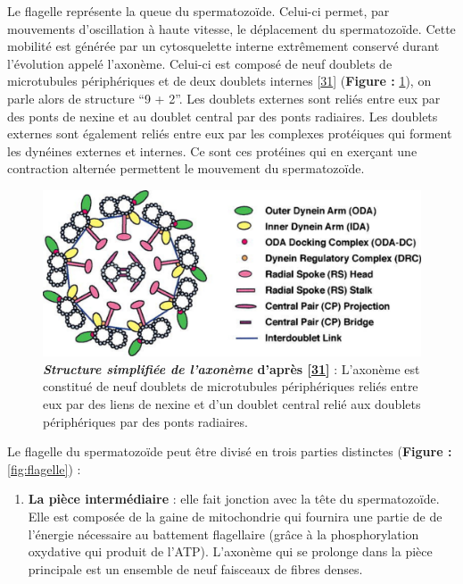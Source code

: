 \documentclass[12pt,a4paper,twoside]{ugathesis}
\providecommand{\tightlist}{%
  \setlength{\itemsep}{0pt}\setlength{\parskip}{0pt}}
\theoremstyle{definition}
\theoremstyle{definition}
\theoremstyle{definition}
\theoremstyle{remark}
\begin{document}
Le flagelle représente la queue du spermatozoïde. Celui-ci permet, par
mouvements d'oscillation à haute vitesse, le déplacement du
spermatozoïde. Cette mobilité est générée par un cytosquelette interne
extrêmement conservé durant l'évolution appelé l'axonème. Celui-ci est
composé de neuf doublets de microtubules périphériques et de deux
doublets internes {[}\protect\hyperlink{ref-Inaba2003}{31}{]}
(\textbf{Figure : }\ref{fig:pictaxoneme}), on parle alors de structure
``9 + 2''. Les doublets externes sont reliés entre eux par des ponts de
nexine et au doublet central par des ponts radiaires. Les doublets
externes sont également reliés entre eux par les complexes protéiques
qui forment les dynéines externes et internes. Ce sont ces protéines qui
en exerçant une contraction alternée permettent le mouvement du
spermatozoïde.







\begin{figure}

{\centering \includegraphics[scale=.3]{figure/axoneme} 

}

\caption[Structure simplifiée de l'axonème]{\textbf{\emph{Structure simplifiée de l'axonème}
d'après {[}\protect\hyperlink{ref-Inaba2003}{31}{]}} : L'axonème est
constitué de neuf doublets de microtubules périphériques reliés entre
eux par des liens de nexine et d'un doublet central relié aux doublets
périphériques par des ponts radiaires.}\label{fig:pictaxoneme}
\end{figure}

Le flagelle du spermatozoïde peut être divisé en trois parties
distinctes (\textbf{Figure : }\ref{fig:flagelle}) :

\begin{enumerate}
\def\labelenumi{\arabic{enumi}.}
\tightlist
\item
  \textbf{La pièce intermédiaire} : elle fait jonction avec la tête du
  spermatozoïde. Elle est composée de la gaine de mitochondrie qui
  fournira une partie de de l'énergie nécessaire au battement
  flagellaire (grâce à la phosphorylation oxydative qui produit de
  l'ATP). L'axonème qui se prolonge dans la pièce principale est un
  ensemble de neuf faisceaux de fibres denses.
\end{enumerate}
\end{document}
